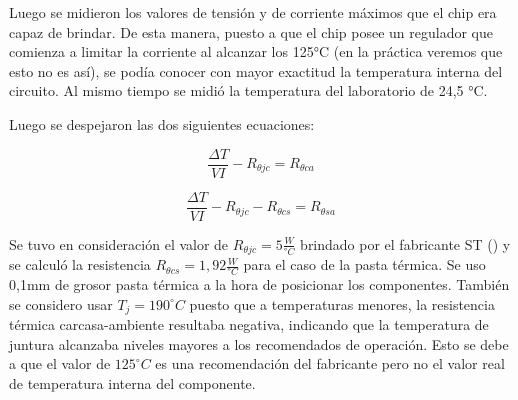 \documentclass{article}
\begin{document}
Luego se midieron los valores de tensión y de corriente máximos que el chip era capaz de brindar. De esta manera, puesto a que el chip posee un regulador que comienza a limitar la corriente al alcanzar los 125°C (en la práctica veremos que esto no es así), se podía conocer con mayor exactitud la temperatura interna del circuito. Al mismo tiempo se midió la temperatura del laboratorio de 24,5 °C. 

Luego se despejaron las dos siguientes ecuaciones:

\begin{equation}
\frac{\Delta T}{VI} - R_{\theta jc} = R_{\theta ca}
\end{equation}

\begin{equation}
\frac{\Delta T}{VI} - R_{\theta jc} - R_{\theta cs} = R_{\theta sa}
\end{equation}

Se tuvo en consideración el valor de $R_{\theta jc} = 5 \frac{W}{°C}$ brindado por el fabricante ST (\cite{LM317}) y se calculó la resistencia $R_{\theta cs}= 1,92 \frac{W}{°C}$ para el caso de la pasta térmica. Se uso 0,1mm de grosor pasta térmica a la hora de posicionar los componentes.  También se considero usar $T_j = 190^\circ C$ puesto que a temperaturas menores, la resistencia térmica carcasa-ambiente resultaba negativa, indicando que la temperatura de juntura alcanzaba niveles mayores a los recomendados de operación. Esto se debe a que el valor de $125^\circ C$ es una recomendación del fabricante pero no el valor real de temperatura interna del componente.

\end{document}
